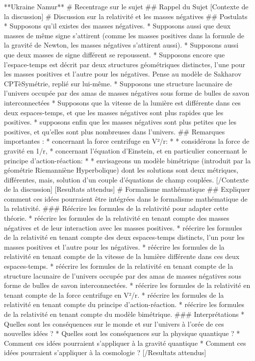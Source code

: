                          **Ukraine Namur**
                         # Recentrage sur le sujet
                         ## Rappel du Sujet
                         [Contexte de la discussion]
# Discussion sur la relativité et les masses négatives
## Postulats
* Supposons qu'il existes des masses négatives. 
* Supposons aussi que deux masses de même signe s'attirent (comme les masses positives dans la formule de la gravité de Newton, les masses négatives s'attirent aussi). 
* Supposons aussi que deux masses de signe différent se repoussent. 
* Supposons encore que l'espace-temps est décrit par deux structures géométriques distinctes, l'une pour les masses positives et l'autre pour les négatives. 
    Pense au modèle de Sakharov CPTèSymétrie, replié sur lui-même.
* Supposons une structure lacunaire de l’univers occupée par des amas de masses négatives sous forme de bulles de savon interconnectées
* Supposons que la vitesse de la lumière est différente dans ces deux espaces-temps, et que les masses négatives sont plus rapides que les positives.
* supposons enfin que les masses négatives sont plus petites que les positives, et qu'elles sont plus nombreuses dans l'univers.
## Remarques importantes : 
* concernant la force centrifuge en V²/r:
* * considérons la force de gravité en 1/r,  
* concernant l'équation d'Einstein, et en particulier concernant le principe d'action-réaction:
* * envisageons un modèle bimétrique (introduit par la géométrie Riemanniène Hyperbolique) dont les solutions sont deux métriques, différentes, mais, solution d'un couple d'équations de champ couplées.
[/Contexte de la discussion]
[Resultats attendus]
# Formalisme mathématique
## Expliquer comment ces idées pourraient être intégrées dans le formalisme mathématique de la relativité.
### Réécrire les formules de la relativité pour adapter cette théorie.
* réécrire les formules de la relativité en tenant compte des masses négatives et de leur interaction avec les masses positives.
* réécrire les formules de la relativité en tenant compte des deux espaces-temps distincts, l'un pour les masses positives et l'autre pour les négatives.
* réécrire les formules de la relativité en tenant compte de la vitesse de la lumière différente dans ces deux espaces-temps.
* réécrire les formules de la relativité en tenant compte de la structure lacunaire de l'univers occupée par des amas de masses négatives sous forme de bulles de savon interconnectées.
* réécrire les formules de la relativité en tenant compte de la force centrifuge en V²/r.
* réécrire les formules de la relativité en tenant compte du principe d'action-réaction.
* réécrire les formules de la relativité en tenant compte du modèle bimétrique.
### Interprétations
* Quelles sont les conséquences sur le monde et sur l'univers à l'orée de ces nouvelles idées ?
* Quelles sont les conséquences sur la physique quantique ?
* Comment ces idées pourraient s'appliquer à la gravité quantique
* Comment ces idées pourraient s'appliquer à la cosmologie ?
[/Resultats attendus]

